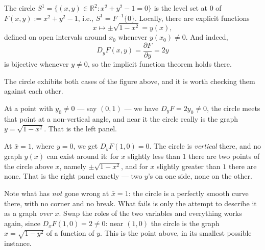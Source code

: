 \begin{example}
The circle $S^1 = \{(x,y) \in \mathbb{R}^2 : x^2+y^2-1=0\}$ is the level set at $0$ of
$F(x,y) := x^2+y^2-1$, i.e., $S^1 = F^{-1}\{0\}$. Locally, there are explicit functions
\[x \mapsto \pm\sqrt{1-x^2} = y(x),\]
defined on open intervals around $x_0$ whenever $y(x_0)\neq0$. And indeed,
\[D_yF(x,y) = \frac{\partial F}{\partial y} = 2y\]
is bijective whenever $y \neq 0$, so the implicit function theorem holds there.

\begin{remark}
The circle exhibits both cases of the figure above, and it is worth checking them against each
other.

At a point with $y_0 \neq 0$ --- say $(0,1)$ --- we have $D_yF = 2y_0 \neq 0$, the circle meets
that point at a non-vertical angle, and near it the circle really is the graph
$y = \sqrt{1-x^2}$. That is the left panel.

At $\bar x = 1$, where $y = 0$, we get $D_yF(1,0) = 0$. The circle is \emph{vertical} there, and
no graph $y(x)$ can exist around it: for $x$ slightly less than $1$ there are two points of the
circle above $x$, namely $\pm\sqrt{1-x^2}$, and for $x$ slightly greater than $1$ there are none.
That is the right panel exactly --- two $y$'s on one side, none on the other.

Note what has \emph{not} gone wrong at $\bar x = 1$: the circle is a perfectly smooth curve
there, with no corner and no break. What fails is only the attempt to describe it as a graph
\emph{over $x$}. Swap the roles of the two variables and everything works again, since
$D_xF(1,0) = 2 \neq 0$: near $(1,0)$ the circle is the graph $x = \sqrt{1-y^2}$ of a function
of $y$. This is the  point above, in its
smallest possible instance.
\end{remark}
\end{example}

